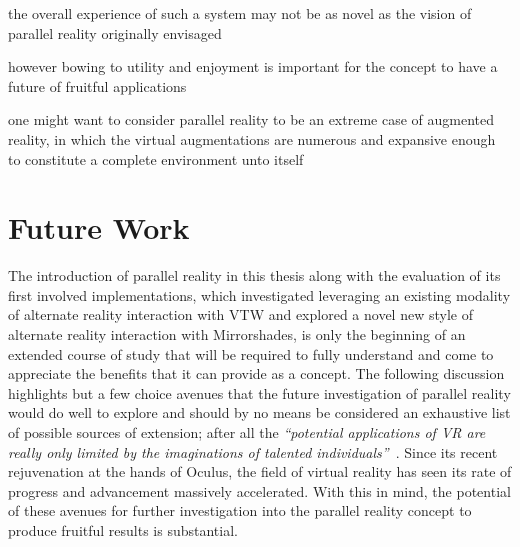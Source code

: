 the overall experience of such a system may not be as novel as the vision of parallel reality originally envisaged

however bowing to utility and enjoyment is important for the concept to have a future of fruitful applications



one might want to consider parallel reality to be an extreme case of augmented reality, in which the virtual augmentations are numerous and expansive enough to constitute a complete environment unto itself







\section{Future Work}

The introduction of parallel reality in this thesis along with the evaluation of its first involved implementations, which investigated leveraging an existing modality of alternate reality interaction with VTW and explored a novel new style of alternate reality interaction with Mirrorshades, is only the beginning of an extended course of study that will be required to fully understand and come to appreciate the benefits that it can provide as a concept. The following discussion highlights but a few choice avenues that the future investigation of parallel reality would do well to explore and should by no means be considered an exhaustive list of possible sources of extension; after all the \textit{``potential applications of VR are really only limited by the imaginations of talented individuals''}~\cite{Giuseppe2014a}. Since its recent rejuvenation at the hands of Oculus, the field of virtual reality has seen its rate of progress and advancement massively accelerated. With this in mind, the potential of these avenues for further investigation into the parallel reality concept to produce fruitful results is substantial.

